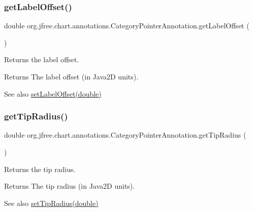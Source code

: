 \subsubsection{\texorpdfstring{get\+Label\+Offset()}{getLabelOffset()}}
{\footnotesize\ttfamily double org.\+jfree.\+chart.\+annotations.\+Category\+Pointer\+Annotation.\+get\+Label\+Offset (\begin{DoxyParamCaption}{ }\end{DoxyParamCaption})}

Returns the label offset.

\begin{DoxyReturn}{Returns}
The label offset (in Java2D units).
\end{DoxyReturn}
\begin{DoxySeeAlso}{See also}
\mbox{\hyperlink{classorg_1_1jfree_1_1chart_1_1annotations_1_1_category_pointer_annotation_ae3941b11e27c687715635e67d364db88}{set\+Label\+Offset(double)}} 
\end{DoxySeeAlso}
\mbox{\label{classorg_1_1jfree_1_1chart_1_1annotations_1_1_category_pointer_annotation_a6cb8c5eac8188dee2635a93069dee373}} 
\subsubsection{\texorpdfstring{get\+Tip\+Radius()}{getTipRadius()}}
{\footnotesize\ttfamily double org.\+jfree.\+chart.\+annotations.\+Category\+Pointer\+Annotation.\+get\+Tip\+Radius (\begin{DoxyParamCaption}{ }\end{DoxyParamCaption})}

Returns the tip radius.

\begin{DoxyReturn}{Returns}
The tip radius (in Java2D units).
\end{DoxyReturn}
\begin{DoxySeeAlso}{See also}
\mbox{\hyperlink{classorg_1_1jfree_1_1chart_1_1annotations_1_1_category_pointer_annotation_af59eb6536b65466595853197e7e0c29d}{set\+Tip\+Radius(double)}} 
\end{DoxySeeAlso}
\mbox{\label{classorg_1_1jfree_1_1chart_1_1annotations_1_1_category_pointer_annotation_a8e390935554cea337da4102c667a18f3}} 
